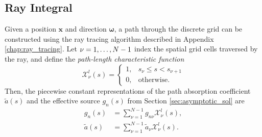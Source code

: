 \documentclass[ms,cpyr,lof,lot]{uathesis}
\renewcommand\vec\bm
\begin{document}
\subsection{Ray Integral}
Given a position $\vec{x}$ and direction $\vec{\omega}$, a path through the discrete grid can be constructed using the ray tracing algorithm described in Appendix \ref{chap:ray_tracing}. 
Let $\nu=1,\ldots,N\nobreak-\nobreak1$ index the spatial grid cells traversed by the ray, and define the \textit{path-length characteristic function}
\begin{equation*}
  \mathcal{X}^l_\nu(s) = \begin{cases}
    1, & s_\nu \leq s < s_{\nu+1} \\
    0, & \mbox{otherwise}.
    \end{cases}
\end{equation*}
Then, the piecewise constant representations of the path absorption coefficient $\tilde{a}(s)$ and the effective source $g_n(s)$ from Section \ref{sec:asymptotic_sol} are
\begin{align*}
  g_n(s) &= \sum_{\nu=1}^{N-1}g_{n\nu}\mathcal{X}^l_\nu(s), \\
  \tilde{a}(s) &= \sum_{\nu=1}^{N-1}\tilde{a}_{\nu}\mathcal{X}^l_\nu(s).
\end{align*}
\end{document}
